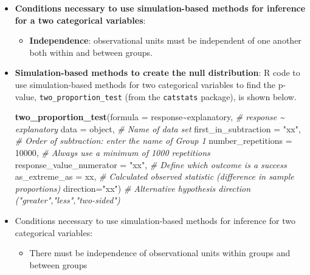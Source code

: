 \documentclass[
]{report}
\newenvironment{Shaded}{\begin{snugshade}}{\end{snugshade}}
\newcommand{\AttributeTok}[1]{\textcolor[rgb]{0.13,0.29,0.53}{#1}}
\newcommand{\CommentTok}[1]{\textcolor[rgb]{0.56,0.35,0.01}{\textit{#1}}}
\newcommand{\DecValTok}[1]{\textcolor[rgb]{0.00,0.00,0.81}{#1}}
\newcommand{\FunctionTok}[1]{\textcolor[rgb]{0.13,0.29,0.53}{\textbf{#1}}}
\newcommand{\NormalTok}[1]{#1}
\newcommand{\SpecialCharTok}[1]{\textcolor[rgb]{0.81,0.36,0.00}{\textbf{#1}}}
\newcommand{\StringTok}[1]{\textcolor[rgb]{0.31,0.60,0.02}{#1}}
\providecommand{\tightlist}{%
  \setlength{\itemsep}{0pt}\setlength{\parskip}{0pt}}
\begin{document}
\begin{itemize}
\item
  \textbf{Conditions necessary to use simulation-based methods for inference for a two categorical variables}:

  \begin{itemize}
  \tightlist
  \item
    \textbf{Independence}: observational units must be independent of one another both within and between groups.
  \end{itemize}
\item
  \textbf{Simulation-based methods to create the null distribution}: R code to use simulation-based methods for two categorical variables to find the p-value, \texttt{two\_proportion\_test} (from the \texttt{catstats} package), is shown below.

\begin{Shaded}
\begin{Highlighting}[]
\FunctionTok{two\_proportion\_test}\NormalTok{(}\AttributeTok{formula =}\NormalTok{ response}\SpecialCharTok{\textasciitilde{}}\NormalTok{explanatory, }\CommentTok{\# response \textasciitilde{} explanatory}
    \AttributeTok{data =}\NormalTok{ object, }\CommentTok{\# Name of data set}
    \AttributeTok{first\_in\_subtraction =} \StringTok{"xx"}\NormalTok{, }\CommentTok{\# Order of subtraction: enter the name of Group 1}
    \AttributeTok{number\_repetitions =} \DecValTok{10000}\NormalTok{, }\CommentTok{\# Always use a minimum of 1000 repetitions}
    \AttributeTok{response\_value\_numerator =} \StringTok{"xx"}\NormalTok{, }\CommentTok{\# Define which outcome is a success}
    \AttributeTok{as\_extreme\_as =}\NormalTok{ xx, }\CommentTok{\# Calculated observed statistic (difference in sample proportions)}
    \AttributeTok{direction=}\StringTok{"xx"}\NormalTok{) }\CommentTok{\# Alternative hypothesis direction ("greater","less","two{-}sided")}
\end{Highlighting}
\end{Shaded}
\item
  Conditions necessary to use simulation-based methods for inference for two categorical variables:

  \begin{itemize}
  \tightlist
  \item
    There must be independence of observational units within groups and between groups
  \end{itemize}
\end{itemize}
\end{document}
